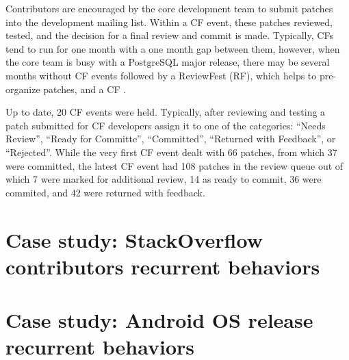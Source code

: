 Contributors are encouraged by the core development team to submit patches into the development mailing list. Within a CF event, 
these patches reviewed, tested, and the decision for a final review and commit is made.  Typically, CFs tend to run for one month 
with a one month gap between them, however, when the core team is busy with a PostgreSQL major release, there may be several 
months without CF events followed by a ReviewFest (RF), which helps to pre-organize patches, and a CF . 

Up to date, 20 CF events were held. Typically, after reviewing and testing a patch submitted for CF developers assign it to one of the 
categories: ``Needs Review'', ``Ready for Committe'', ``Committed'', ``Returned with Feedback'', or ``Rejected''. 
While the very first CF event dealt with 66 patches, from which 37 were committed, the latest CF event had 108 patches in the review 
queue out of which 7 were marked for additional review, 14 as ready to commit, 36 were commited, and 42 were returned with feedback.





\section{Case study: StackOverflow contributors recurrent behaviors}
\section{Case study: Android OS release recurrent behaviors}
